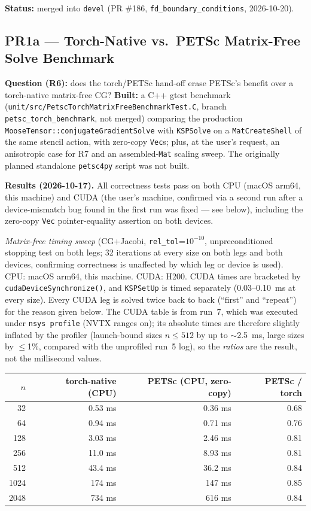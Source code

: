 \documentclass[11pt]{article}
\newcommand{\pr}[2]{\subsection{PR#1 --- #2}}
\newcommand{\status}[1]{\textcolor{marlinteal}{\textbf{Status:}} #1}
\begin{document}
\status{merged into \texttt{devel} (PR \#186, \texttt{fd\_boundary\_conditions},
2026-10-20).}

\pr{1a}{Torch-Native vs.\ PETSc Matrix-Free Solve Benchmark}
\textbf{Question (R6):} does the torch/PETSc hand-off erase PETSc's benefit
over a torch-native matrix-free CG? \textbf{Built:} a C++ gtest benchmark
(\texttt{unit/src/PetscTorchMatrixFreeBenchmarkTest.C}, branch
\texttt{petsc\_torch\_benchmark}, not merged) comparing the production
\texttt{MooseTensor::conjugateGradientSolve} with \texttt{KSPSolve} on a
\texttt{MatCreateShell} of the same stencil action, with zero-copy
\texttt{Vec}s; plus, at the user's request, an anisotropic case for R7 and an
assembled-\texttt{Mat} scaling sweep. The originally planned standalone
\texttt{petsc4py} script was not built.

\textbf{Results (2026-10-17).} All correctness tests pass on both CPU
(macOS arm64, this machine) and CUDA (the user's machine, confirmed via a
second run after a device-mismatch bug found in the first run was fixed
--- see below), including the zero-copy \texttt{Vec} pointer-equality
assertion on both devices.

\textit{Matrix-free timing sweep} (CG+Jacobi, \texttt{rel\_tol}=$10^{-10}$,
unpreconditioned stopping test on both legs; 32 iterations at every size
on both legs and both devices, confirming correctness is unaffected by
which leg or device is used). CPU: macOS arm64, this machine. CUDA: H200.
CUDA times are bracketed by \texttt{cudaDeviceSynchronize()}, and
\texttt{KSPSetUp} is timed separately (0.03--0.10~ms at every size). Every
CUDA leg is solved twice back to back (``first'' and ``repeat'') for the
reason given below. The CUDA table is from run~7, which was executed under
\texttt{nsys profile} (NVTX ranges on); its absolute times are therefore
slightly inflated by the profiler (launch-bound sizes $n\le512$ by up to
$\sim$2.5~ms, large sizes by $\le$1\%, compared with the unprofiled run~5
log), so the \textit{ratios} are the result, not the millisecond values.

\begin{center}
\footnotesize
\begin{tabular}{rrrr}
\toprule
$n$ & torch-native (CPU) & PETSc (CPU, zero-copy) & PETSc / torch \\
\midrule
32 & 0.53 ms & 0.36 ms & 0.68 \\
64 & 0.94 ms & 0.71 ms & 0.76 \\
128 & 3.03 ms & 2.46 ms & 0.81 \\
256 & 11.0 ms & 8.93 ms & 0.81 \\
512 & 43.4 ms & 36.2 ms & 0.84 \\
1024 & 174 ms & 147 ms & 0.85 \\
2048 & 734 ms & 616 ms & 0.84 \\
\bottomrule
\end{tabular}
\end{center}
\end{document}

